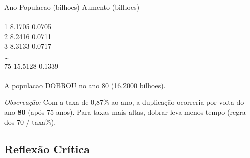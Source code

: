 \documentclass[12pt,a4paper]{article}
\begin{document}
\begin{respostabox}
\begin{saida}
\hspace{0.3em}Ano \hspace{1.5em}Populacao (bilhoes) \hspace{1em}Aumento (bilhoes)\\
----- -------------------- --------------------\\
\hspace{2em}1 \hspace{8em}8.1705 \hspace{8em}0.0705\\
\hspace{2em}2 \hspace{8em}8.2416 \hspace{8em}0.0711\\
\hspace{2em}3 \hspace{8em}8.3133 \hspace{8em}0.0717\\
\ldots\\
\hspace{1.5em}75 \hspace{7.5em}15.5128 \hspace{8em}0.1339\\
\\
A populacao DOBROU no ano 80 (16.2000 bilhoes).
\end{saida}

\textit{Observação:} Com a taxa de 0,87\% ao ano, a duplicação ocorreria por volta
do ano \textbf{80} (após 75 anos). Para taxas mais altas, dobrar leva menos tempo
(regra dos 70 / taxa\%).
\end{respostabox}

\subsection*{Reflexão Crítica}
\end{document}
